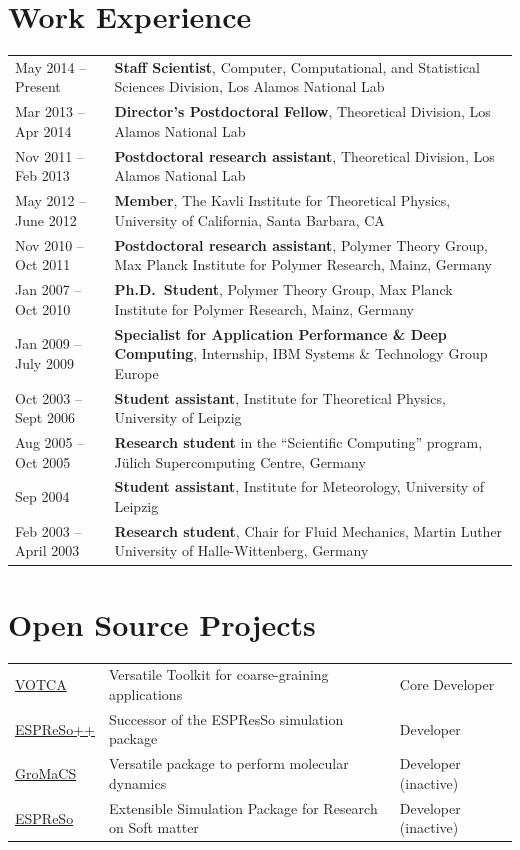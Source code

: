 \documentclass{article}
\begin{document}
\section*{Work Experience}
\begin{tabular}{p{}p{}}
May 2014 -- Present & \textbf{Staff Scientist}, Computer, Computational, and Statistical Sciences Division, Los Alamos National Lab\\
Mar 2013 -- Apr 2014 & \textbf{Director's Postdoctoral Fellow}, Theoretical Division, Los Alamos National Lab\\
Nov 2011 -- Feb 2013 & \textbf{Postdoctoral research assistant}, Theoretical Division, Los Alamos National Lab\\
May 2012 -- June 2012 & \textbf{Member}, The Kavli Institute for Theoretical Physics, University of California, Santa Barbara, CA \\
Nov 2010 -- Oct 2011 & \textbf{Postdoctoral research assistant}, Polymer Theory Group, Max Planck Institute for Polymer Research, Mainz, Germany\\
Jan 2007 -- Oct 2010 & \textbf{Ph.D.\ Student}, Polymer Theory Group, Max Planck Institute for Polymer Research, Mainz, Germany\\
Jan 2009 -- July 2009 & \textbf{Specialist for Application Performance \& Deep Computing}, Internship, IBM Systems \& Technology Group Europe \\
Oct 2003 -- Sept 2006 & \textbf{Student assistant}, Institute for Theoretical Physics, University of Leipzig \\
Aug 2005 -- Oct 2005 & \textbf{Research student} in the ``Scientific Computing'' program, J{\"u}lich Supercomputing Centre, Germany \\
Sep 2004 & \textbf{Student assistant}, Institute for Meteorology, University of Leipzig \\
Feb 2003 -- April 2003 & \textbf{Research student}, Chair for Fluid Mechanics, Martin Luther University of Halle-Wittenberg, Germany \\
\end{tabular}

\vspace{-2mm}
\section*{Open Source Projects}
\begin{tabular}{lll}
\href{http://www.votca.org}{VOTCA} & Versatile Toolkit for coarse-graining applications & Core Developer\\
\href{http://www.espresso-pp.de}{ESPReSo++} & Successor of the ESPResSo simulation package & Developer\\
\href{http://www.gromacs.org}{GroMaCS} & Versatile package to perform molecular dynamics & Developer (inactive)\\
\href{http://www.espressomd.org}{ESPReSo} & Extensible Simulation Package for Research on Soft matter & Developer (inactive)\\
\end{tabular}\\
\end{document}
